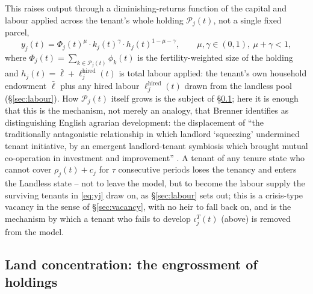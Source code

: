 \documentclass[11pt,english]{article}
\begin{document}
This raises output through a diminishing-returns function of the capital and labour applied across the tenant's whole holding $\mathcal{P}_j(t)$, not a single fixed parcel,
\begin{equation}
y_j(t) = \Phi_j(t)^{\mu}\cdot k_j(t)^{\gamma}\cdot h_j(t)^{1-\mu-\gamma}, \qquad \mu,\gamma\in(0,1),\ \mu+\gamma<1,
\label{eq:yj}
\end{equation}
where $\Phi_j(t) = \sum_{k\in\mathcal{P}_j(t)}\phi_k(t)$ is the fertility-weighted size of the holding and $h_j(t) = \bar\ell + \ell_j^{\text{hired}}(t)$ is total labour applied: the tenant's own household endowment $\bar\ell$ plus any hired labour $\ell_j^{\text{hired}}(t)$ drawn from the landless pool (\S\ref{sec:labour}). How $\mathcal{P}_j(t)$ itself grows is the subject of \S\ref{sec:engrossment}; here it is enough that this is the mechanism, not merely an analogy, that Brenner identifies as distinguishing English agrarian development: the displacement of ``the traditionally antagonistic relationship in which landlord `squeezing' undermined tenant initiative, by an emergent landlord-tenant symbiosis which brought mutual co-operation in investment and improvement'' \cite[p.65]{brenner1976agrarian}. A tenant of any tenure state who cannot cover $\rho_j(t)+c_j$ for $\tau$ consecutive periods loses the tenancy and enters the Landless state -- not to leave the model, but to become the labour supply the surviving tenants in \eqref{eq:yj} draw on, as \S\ref{sec:labour} sets out; this is a crisis-type vacancy in the sense of \S\ref{sec:vacancy}, with no heir to fall back on, and is the mechanism by which a tenant who fails to develop $\iota_j^{T}(t)$ (above) is removed from the model.

\subsection{Land concentration: the engrossment of holdings}
\label{sec:engrossment}
\end{document}
